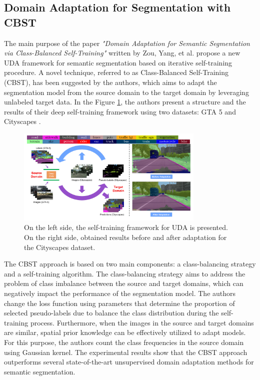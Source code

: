 \subsection{Domain Adaptation for Segmentation with CBST}

The main purpose of the paper \textit{"Domain Adaptation for Semantic Segmentation via Class-Balanced Self-Training"} written by Zou, Yang, et al. \cite{zou2018unsupervised} propose a new UDA framework for semantic segmentation based on iterative self-training procedure. A novel technique, referred to as Class-Balanced Self-Training (CBST), has been suggested by the authors, which aims to adapt the segmentation model from the source domain to the target domain by leveraging unlabeled target data. In the Figure \ref{fig: sem_seg}, the authors present a structure and the results of their deep self-training framework using two datasets: GTA 5 \cite{richter2016playing} and Cityscapes \cite{cordts2016cityscapes}.

\begin{figure}[H]
    \centering
    \includegraphics[width=0.8\textwidth]{Figures/From articles/semantic_segmentation.png}
    \caption{ On the left side, the self-training framework for UDA is presented. On the right side, obtained results before and after adaptation for the Cityscapes dataset.}
    \label{fig: sem_seg}
\end{figure}

The CBST approach is based on two main components: a class-balancing strategy and a self-training algorithm. The class-balancing strategy aims to address the problem of class imbalance between the source and target domains, which can negatively impact the performance of the segmentation model. The authors change the loss function using parameters that determine the proportion of selected pseudo-labels due to balance the class distribution during the self-training process. Furthermore, when the images in the source and target domains are similar, spatial prior knowledge can be effectively utilized to adapt models. For this purpose, the authors count the class frequencies in the source domain using Gaussian kernel. The experimental results show that the CBST approach outperforms several state-of-the-art unsupervised domain adaptation methods for semantic segmentation. 